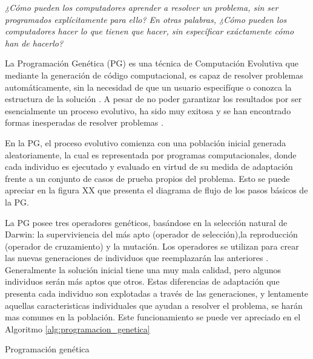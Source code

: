 \textit{¿Cómo pueden los computadores aprender a resolver un problema, sin ser programados explícitamente para ello? En otras palabras, ¿Cómo pueden los computadores hacer lo que tienen que hacer, sin específicar exáctamente cómo han de hacerlo?}

La Programación Genética (PG) es una técnica de Computación Evolutiva que mediante la generación de código computacional, es capaz de resolver problemas automáticamente, sin la necesidad de que un usuario especifíque o conozca la estructura de la solución \citep{poli_2008}. A pesar de no poder garantizar los resultados por ser esencialmente un proceso evolutivo, ha sido muy exitosa y se han encontrado formas inesperadas de resolver problemas \citep{holland_1975}.

En la PG, el proceso evolutivo comienza con una población inicial generada aleatoriamente, la cual es representada por programas computacionales, donde cada individuo es ejecutado y evaluado en virtud de su medida de adaptación frente a un conjunto de casos de prueba propios del problema. Esto se puede apreciar en la figura XX que presenta el diagrama de flujo de los pasos básicos de la PG.


La PG posee tres operadores genéticos, basándose en la selección natural de Darwin:  la superviviencia del más apto (operador de selección),la reproducción (operador de cruzamiento) y la mutación. Los operadores se utilizan para crear las nuevas generaciones de individuos que reemplazarán las anteriores \citep{poli_2008}. Generalmente la solución inicial tiene una muy mala calidad, pero algunos individuos serán más aptos que otros. Estas diferencias de adaptación que presenta cada individuo son explotadas a través de las generaciones, y lentamente aquellas caracteristicas individuales que ayudan a resolver el problema, se harán mas comunes en la población. Este funcionamiento se puede ver apreciado en el Algoritmo \ref{alg:programacion_genetica}

\begin{algorithm}[H]
    \begin{algorithmic}[1]
        \ENDWHILE
    \end{algorithmic}
    \caption{Programación genética}\label{alg:programacion_genetica}
\end{algorithm}



